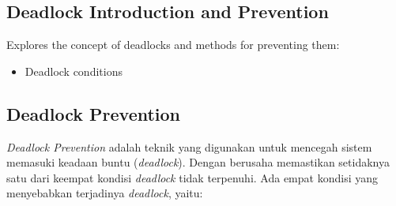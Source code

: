 \documentclass[12pt]{article}
\begin{document}
\subsection{Deadlock Introduction and Prevention}
Explores the concept of deadlocks and methods for preventing them:
\begin{itemize}
    \item Deadlock conditions
    \end{itemize}
    \subsection{Deadlock Prevention} 
\hspace{1cm} \textit{Deadlock Prevention} adalah teknik yang digunakan untuk mencegah sistem memasuki keadaan buntu (\textit{deadlock}). Dengan berusaha memastikan setidaknya  satu dari keempat kondisi \textit{deadlock} tidak terpenuhi. Ada empat kondisi yang menyebabkan terjadinya \textit{deadlock}, yaitu:
\end{document}
